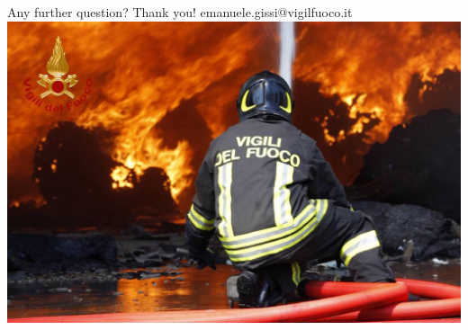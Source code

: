 \documentclass[aspectratio=169]{beamer}
\begin{document}
\begin{frame}[fragile]{}
  \centering
  \vfill
  {\fontsize{20}{50}\selectfont Any further question?}
  \linebreak
  {\fontsize{40}{50}\selectfont Thank you!}
  \linebreak
  {\fontsize{15}{50}\selectfont emanuele.gissi@vigilfuoco.it}
  \centering
  \vfill
  \includegraphics[width=.35\linewidth]{images/vigilifuoco.jpeg}
  \vfill
\end{frame}
\end{document}
